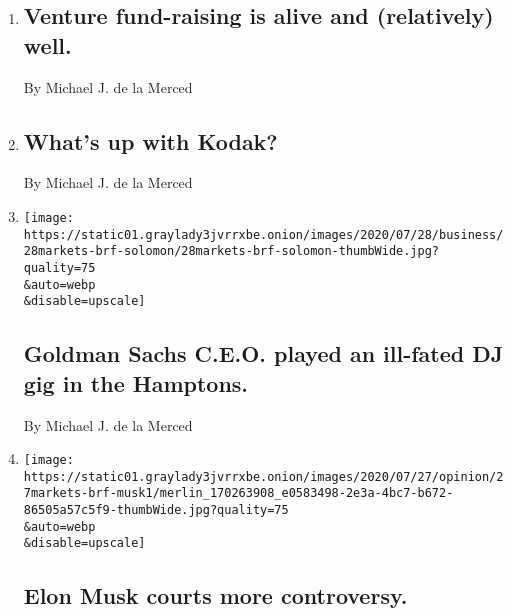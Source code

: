 \begin{enumerate}
\def\labelenumi{\arabic{enumi}.}
\item
  \href{/2020/08/03/business/venture-fund-raising-is-alive-and-relatively-well.html}{}

  \hypertarget{venture-fund-raising-is-alive-and-relatively-well}{%
  \subsection{Venture fund-raising is alive and (relatively)
  well.}\label{venture-fund-raising-is-alive-and-relatively-well}}

  By Michael J. de la Merced
\item
  \href{/2020/07/30/business/whats-up-with-kodak.html}{}

  \hypertarget{whats-up-with-kodak}{%
  \subsection{What's up with Kodak?}\label{whats-up-with-kodak}}

  By Michael J. de la Merced
\item
  \href{/2020/07/28/business/goldman-sachs-ceo-played-an-ill-fated-dj-gig-in-the-hamptons.html}{}

  \texttt{[image: https://static01.graylady3jvrrxbe.onion/images/2020/07/28/business/28markets-brf-solomon/28markets-brf-solomon-thumbWide.jpg?quality=75\\\&auto=webp\\\&disable=upscale]}

  \hypertarget{goldman-sachs-ceo-played-an-ill-fated-dj-gig-in-the-hamptons}{%
  \subsection{Goldman Sachs C.E.O. played an ill-fated DJ gig in the
  Hamptons.}\label{goldman-sachs-ceo-played-an-ill-fated-dj-gig-in-the-hamptons}}

  By Michael J. de la Merced
\item
  \href{/2020/07/27/business/elon-musk-courts-more-controversy.html}{}

  \texttt{[image: https://static01.graylady3jvrrxbe.onion/images/2020/07/27/opinion/27markets-brf-musk1/merlin\_170263908\_e0583498-2e3a-4bc7-b672-86505a57c5f9-thumbWide.jpg?quality=75\\\&auto=webp\\\&disable=upscale]}

  \hypertarget{elon-musk-courts-more-controversy}{%
  \subsection{Elon Musk courts more
  controversy.}\label{elon-musk-courts-more-controversy}}


\end{enumerate}
